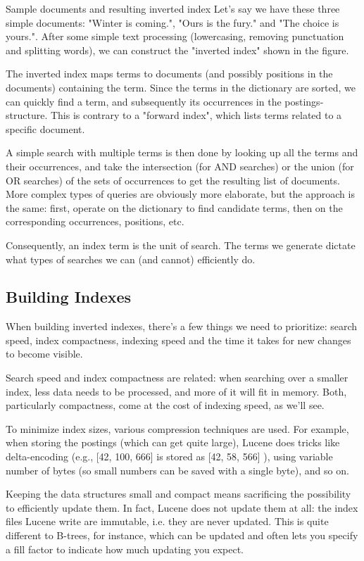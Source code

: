 Sample documents and resulting inverted index
Let's say we have these three simple documents: "Winter is coming.", "Ours is the fury." and "The choice is yours.". After some simple text processing (lowercasing, removing punctuation and splitting words), we can construct the "inverted index" shown in the figure.

The inverted index maps terms to documents (and possibly positions in the documents) containing the term. Since the terms in the dictionary are sorted, we can quickly find a term, and subsequently its occurrences in the postings-structure. This is contrary to a "forward index", which lists terms related to a specific document.

A simple search with multiple terms is then done by looking up all the terms and their occurrences, and take the intersection (for AND searches) or the union (for OR searches) of the sets of occurrences to get the resulting list of documents. More complex types of queries are obviously more elaborate, but the approach is the same: first, operate on the dictionary to find candidate terms, then on the corresponding occurrences, positions, etc.

Consequently, an index term is the unit of search. The terms we generate dictate what types of searches we can (and cannot) efficiently do.


\subsection*{Building Indexes}

When building inverted indexes, there's a few things we need to prioritize: search speed, index compactness, indexing speed and the time it takes for new changes to become visible.

Search speed and index compactness are related: when searching over a smaller index, less data needs to be processed, and more of it will fit in memory. Both, particularly compactness, come at the cost of indexing speed, as we'll see.

To minimize index sizes, various compression techniques are used. For example, when storing the postings (which can get quite large), Lucene does tricks like delta-encoding (e.g., [42, 100, 666] is stored as [42, 58, 566] ), using variable number of bytes (so small numbers can be saved with a single byte), and so on.

Keeping the data structures small and compact means sacrificing the possibility to efficiently update them. In fact, Lucene does not update them at all: the index files Lucene write are immutable, i.e. they are never updated. This is quite different to B-trees, for instance, which can be updated and often lets you specify a fill factor to indicate how much updating you expect.

